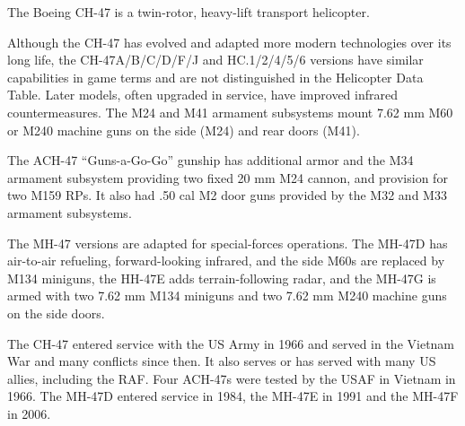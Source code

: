 

The Boeing CH-47 is a twin-rotor, heavy-lift transport helicopter.

Although the CH-47 has evolved and adapted more modern technologies over its long life, the CH-47A/B/C/D/F/J and HC.1/2/4/5/6 versions have similar capabilities in game terms and are not distinguished in the Helicopter Data Table. Later models, often upgraded in service, have improved infrared countermeasures. The M24 and M41 armament subsystems mount 7.62 mm M60 or M240 machine guns on the side (M24) and rear doors (M41).

The ACH-47 “Guns-a-Go-Go” gunship has additional armor and the M34 armament subsystem providing two fixed 20 mm M24 cannon, and provision for two M159  RPs. It also had .50 cal M2 door guns provided by the M32 and M33 armament subsystems.

The MH-47 versions are adapted for special-forces operations. The MH-47D has air-to-air refueling, forward-looking infrared, and the side M60s are replaced by M134 miniguns, the HH-47E adds terrain-following radar, and the MH-47G is armed with two 7.62 mm M134 miniguns and two 7.62 mm M240 machine guns on the side doors.

The CH-47 entered service with the US Army in 1966 and served in the Vietnam War and many conflicts since then. It also serves or has served with many US allies, including the RAF. Four ACH-47s were tested by the USAF in Vietnam in 1966. The MH-47D entered service in 1984, the MH-47E in 1991 and the MH-47F in 2006.
